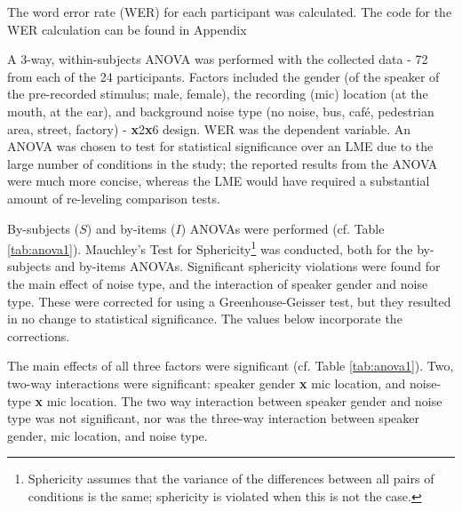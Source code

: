 \DIFdelend The word error rate (WER) for each \DIFdelbegin {}\DIFdelend \DIFaddbegin {}\DIFaddend participant was calculated. The code for the WER calculation can be found in Appendix \DIFdelbegin {}\DIFdelend \DIFaddbegin {}\DIFaddend 

A 3-way, within-subjects ANOVA was performed with the collected data - 72 \DIFdelbegin {}\DIFdelend \DIFaddbegin {}\DIFaddend from each of the 24 participants. Factors included the gender (of the speaker of the pre-recorded stimulus; male, female), the recording (mic) location (at the mouth, at the ear), and background noise type (no noise, bus, caf\'{e}, pedestrian area, street, factory) - \DIFaddbegin {}\textbf{x}2\textbf{x}6 design.  WER was the dependent variable.  An ANOVA was chosen to test for statistical significance over an LME due to the large number of conditions in the study; the reported results from the ANOVA were much more concise, whereas the LME would have required a substantial amount of re-leveling comparison tests.  

By-subjects ($S$) and by-items ($I$) ANOVAs were performed (cf. Table \ref{tab:anova1}). Mauchley's Test for Sphericity\footnote{Sphericity assumes that the variance of the differences between all pairs of conditions is the same; sphericity is violated when this is not the case.} was conducted, both for the by-subjects and by-items ANOVAs.  Significant sphericity violations were found for the main effect of noise type, and the interaction of speaker gender and noise type.  These were corrected for using a Greenhouse-Geisser test, but they resulted in no change to statistical significance.  The values below incorporate the corrections.


The main effects of all three factors were significant (cf. Table \ref{tab:anova1}).  Two, two-way interactions were significant: speaker gender \textbf{x} mic location, and noise-type \textbf{x} mic location. The two way interaction between speaker gender and noise type was not significant, nor was the three-way interaction between speaker gender, mic location, and noise type.



